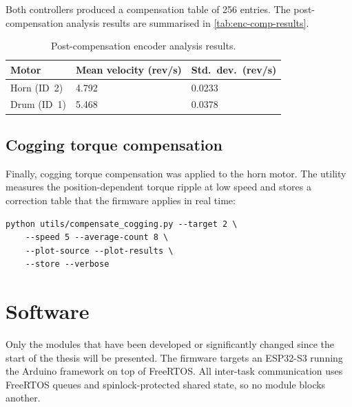 \noindent
Both controllers produced a compensation table of 256 entries.
The post-compensation analysis results are summarised in \autoref{tab:enc-comp-results}.

\begin{table}[H]
	\caption{Post-compensation encoder analysis results.}
	\label{tab:enc-comp-results}
	\begin{center}
		\begin{tabular}[c]{l l l}
			\hline
			\textbf{Motor} & \textbf{Mean velocity (rev/s)} & \textbf{Std.\ dev.\ (rev/s)} \\
			\hline
			Horn (ID~2)    & 4.792                          & 0.0233                       \\
			Drum (ID~1)    & 5.468                          & 0.0378                       \\
			\hline
		\end{tabular}
	\end{center}
\end{table}

\subsection{Cogging torque compensation}

Finally, cogging torque compensation was applied to the horn motor.
The utility measures the position-dependent torque ripple at low speed and stores a correction
table that the firmware applies in real time:

\begin{listing}[H]
	\begin{verbatim}
python utils/compensate_cogging.py --target 2 \
    --speed 5 --average-count 8 \
    --plot-source --plot-results \
    --store --verbose
\end{verbatim}
	\caption{Cogging torque compensation for the horn motor (ID~2).}
	\label{lst:moteus-cog-comp}
\end{listing}



\section{Software}
Only the modules that have been developed or significantly changed since the start of the thesis will be presented.
The firmware targets an ESP32-S3 running the Arduino framework on top of FreeRTOS.
All inter-task communication uses FreeRTOS queues and spinlock-protected shared state,
so no module blocks another.

